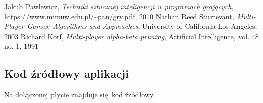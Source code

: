 \documentclass{pracamgr}
\begin{document}
\begin{thebibliography}{98}

 Jakub Pawlewicz, \textit{Techniki sztucznej inteligencji
    w programach grających}, https://www.mimuw.edu.pl/\textasciitilde{}pan/gry.pdf, 2010
 Nathan Reed Sturtevant, \textit{Multi-Player Games: Algorithms and Approaches}, University of California Los Angeles, 2003
 Richard Korf, \textit{Multi-player alpha-beta pruning}, Artificial Intelligence, vol. 48 no. 1, 1991

\end{thebibliography}

\begin{appendices}

\chapter{Kod źródłowy aplikacji}
Na dołączonej płycie znajduje się kod źródłowy.

\end{appendices}
\end{document}
